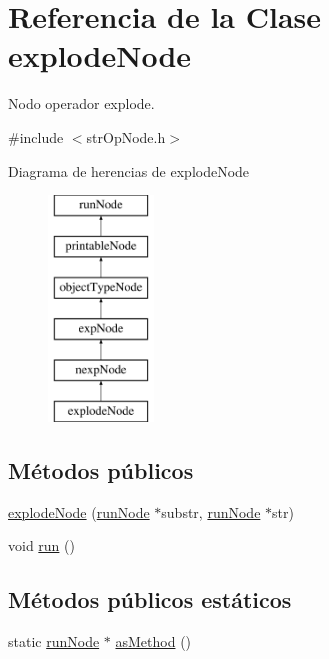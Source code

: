 \hypertarget{classexplodeNode}{\section{Referencia de la Clase explode\-Node}
\label{classexplodeNode}
}


Nodo operador explode.  




{\ttfamily \#include $<$str\-Op\-Node.\-h$>$}

Diagrama de herencias de explode\-Node\begin{figure}[H]
\begin{center}
\leavevmode
\includegraphics[height=6.000000cm]{classexplodeNode}
\end{center}
\end{figure}
\subsection*{Métodos públicos}
\begin{DoxyCompactItemize}
\item 
\hyperlink{classexplodeNode_a90c920b30840535e2ad7c27913e91f7c}{explode\-Node} (\hyperlink{classrunNode}{run\-Node} $\ast$substr, \hyperlink{classrunNode}{run\-Node} $\ast$str)
\item 
void \hyperlink{classexplodeNode_a1bb7df027458cb1e63d5b0898540b114}{run} ()
\end{DoxyCompactItemize}
\subsection*{Métodos públicos estáticos}
\begin{DoxyCompactItemize}
\item 
static \hyperlink{classrunNode}{run\-Node} $\ast$ \hyperlink{classexplodeNode_aea0516f602785514e0a709b4f0867774}{as\-Method} ()
\end{DoxyCompactItemize}


